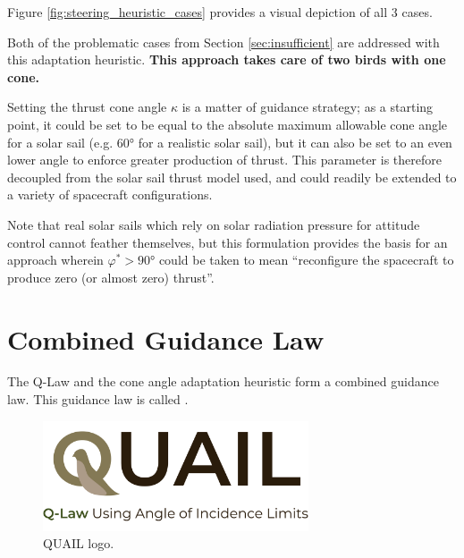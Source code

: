 
Figure \ref{fig:steering_heuristic_cases} provides a visual depiction of all 3 cases.



Both of the problematic cases from Section \ref{sec:insufficient} are addressed with this adaptation heuristic. \textbf{This approach takes care of two birds with one cone.}

Setting the thrust cone angle \(\kappa\) is a matter of guidance strategy; as a starting point, it could be set to be equal to the absolute maximum allowable cone angle for a solar sail (e.g. \ang{60} for a realistic solar sail), but it can also be set to an even lower angle to enforce greater production of thrust. This parameter is therefore decoupled from the solar sail thrust model used, and could readily be extended to a variety of spacecraft configurations.

Note that real solar sails which rely on solar radiation pressure for attitude control cannot feather
themselves, but this formulation provides the basis for an approach wherein \(\varphi^* > \ang{90}\) could be taken to mean ``reconfigure the spacecraft to produce zero (or almost zero) thrust''.

\section{Combined Guidance Law}
The Q-Law and the cone angle adaptation heuristic form a combined guidance law. This guidance law is called .

\begin{figure}[H]
    \centering
    \includegraphics[width=0.7\textwidth]{figures/quail_logo_v2.pdf}
    \caption{QUAIL logo.}
    \label{fig:quail_logo}
\end{figure}


